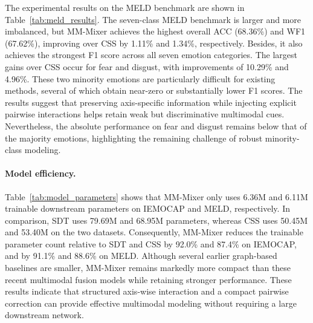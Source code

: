 \documentclass[letterpaper]{article} %
\begin{document}

The experimental results on the MELD benchmark are shown in Table~\ref{tab:meld_results}. The seven-class MELD benchmark is larger and more imbalanced, but MM-Mixer achieves the highest overall ACC (68.36\%) and WF1 (67.62\%), improving over CSS by 1.11\% and 1.34\%, respectively. Besides, it also achieves the strongest F1 score across all seven emotion categories. The largest gains over CSS occur for fear and disgust, with improvements of 10.29\% and 4.96\%. These two minority emotions are particularly difficult for existing methods, several of which obtain near-zero or substantially lower F1 scores. The results
suggest that preserving axis-specific information while injecting explicit pairwise interactions helps retain weak but discriminative multimodal cues. Nevertheless, the absolute performance on fear and disgust remains below that of the majority emotions, highlighting the remaining challenge of robust minority-class modeling.

\paragraph{Model efficiency.}
Table~\ref{tab:model_parameters} shows that MM-Mixer only uses 6.36M and 6.11M trainable downstream parameters on IEMOCAP and MELD, respectively. In comparison, SDT uses 79.69M and 68.95M parameters, whereas CSS uses 50.45M and 53.40M on the two datasets. Consequently,
MM-Mixer reduces the trainable parameter count relative to SDT and CSS by 92.0\% and 87.4\% on IEMOCAP, and by 91.1\% and 88.6\% on MELD. Although several earlier graph-based baselines are smaller, MM-Mixer remains markedly more compact than these recent multimodal fusion
models while retaining stronger performance. These results indicate that structured axis-wise interaction and a compact pairwise correction can provide effective multimodal modeling without requiring a large downstream network.
\end{document}
